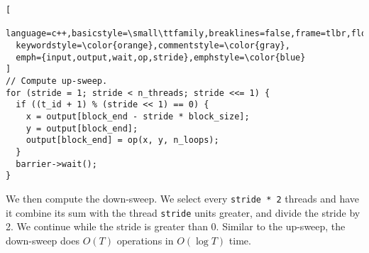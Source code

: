 \documentclass{article}
\begin{document}
\begin{lstlisting}[
  language=c++,basicstyle=\small\ttfamily,breaklines=false,frame=tlbr,float=htbp,
  keywordstyle=\color{orange},commentstyle=\color{gray},
  emph={input,output,wait,op,stride},emphstyle=\color{blue}
]
// Compute up-sweep.
for (stride = 1; stride < n_threads; stride <<= 1) {
  if ((t_id + 1) % (stride << 1) == 0) {
    x = output[block_end - stride * block_size];
    y = output[block_end];
    output[block_end] = op(x, y, n_loops);
  }
  barrier->wait();
}
\end{lstlisting}

We then compute the down-sweep.
We select every \texttt{\small stride * 2} threads and have it combine its sum
with the thread \texttt{\small stride} units greater, and divide the stride by 2.
We continue while the stride is greater than 0.
Similar to the up-sweep, the down-sweep does $O(T)$ operations in $O(\log{T})$
time.
\end{document}
